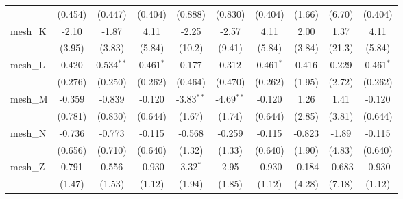 \begin{tabular}{lccccccccc}
                                                               & (0.454)        & (0.447)        & (0.404)       & (0.888)       & (0.830)       & (0.404)       & (1.66)        & (6.70)  & (0.404)\\   
   mesh\_K                                                     & -2.10          & -1.87          & 4.11          & -2.25         & -2.57         & 4.11          & 2.00          & 1.37    & 4.11\\   
                                                               & (3.95)         & (3.83)         & (5.84)        & (10.2)        & (9.41)        & (5.84)        & (3.84)        & (21.3)  & (5.84)\\   
   mesh\_L                                                     & 0.420          & 0.534$^{**}$   & 0.461$^{*}$   & 0.177         & 0.312         & 0.461$^{*}$   & 0.416         & 0.229   & 0.461$^{*}$\\   
                                                               & (0.276)        & (0.250)        & (0.262)       & (0.464)       & (0.470)       & (0.262)       & (1.95)        & (2.72)  & (0.262)\\   
   mesh\_M                                                     & -0.359         & -0.839         & -0.120        & -3.83$^{**}$  & -4.69$^{**}$  & -0.120        & 1.26          & 1.41    & -0.120\\   
                                                               & (0.781)        & (0.830)        & (0.644)       & (1.67)        & (1.74)        & (0.644)       & (2.85)        & (3.81)  & (0.644)\\   
   mesh\_N                                                     & -0.736         & -0.773         & -0.115        & -0.568        & -0.259        & -0.115        & -0.823        & -1.89   & -0.115\\   
                                                               & (0.656)        & (0.710)        & (0.640)       & (1.32)        & (1.33)        & (0.640)       & (1.90)        & (4.83)  & (0.640)\\   
   mesh\_Z                                                     & 0.791          & 0.556          & -0.930        & 3.32$^{*}$    & 2.95          & -0.930        & -0.184        & -0.683  & -0.930\\   
                                                               & (1.47)         & (1.53)         & (1.12)        & (1.94)        & (1.85)        & (1.12)        & (4.28)        & (7.18)  & (1.12)\\   

\end{tabular}
